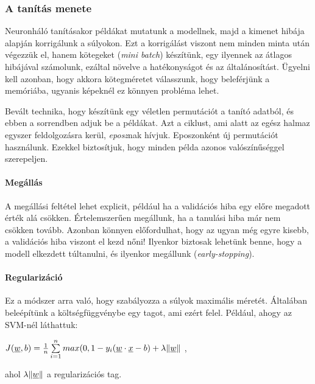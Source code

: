 \subsubsection{A tanítás menete}

Neuronháló tanításakor példákat mutatunk a modellnek, majd a kimenet
hibája alapján korrigálunk a súlyokon. Ezt a korrigálást viszont nem
minden minta után végezzük el, hanem kötegeket (\textit{mini batch}) 
készítünk, egy ilyennek az átlagos hibájával számolunk, ezáltal 
növelve a hatékonyságot és az általánosítást. Ügyelni kell azonban, hogy
akkora kötegméretet válasszunk, hogy beleférjünk a memóriába, ugyanis 
képeknél ez könnyen probléma lehet.


Bevált technika, hogy készítünk egy véletlen permutációt a tanító adatból,
és ebben a sorrendben adjuk be a példákat. Azt a ciklust, ami alatt 
az egész halmaz egyszer feldolgozásra kerül, \textit{eposz}nak hívjuk.
Eposzonként új permutációt használunk. Ezekkel biztosítjuk, hogy minden
példa azonos valószínűséggel szerepeljen.

\paragraph{Megállás}

A megállási feltétel lehet explicit, például ha a validációs hiba egy előre
megadott érték alá csökken. Értelemszerűen megállunk, ha a tanulási hiba már nem csökken tovább.
Azonban könnyen előfordulhat, hogy az ugyan még egyre kisebb, a validációs hiba
viszont el kezd nőni! Ilyenkor biztosak lehetünk benne, hogy a modell elkezdett
túltanulni, és ilyenkor megállunk (\textit{early-stopping}).


\paragraph{Regularizáció}

Ez a módszer arra való, hogy szabályozza a súlyok maximális méretét. Általában beleépítünk a 
költségfüggvénybe  egy tagot, ami ezért felel. Például, ahogy az SVM-nél láthattuk:

$ J(\underline{w},b)  = \frac{1}{n} \sum\limits_{i=1}^{n} 
max(0, 1 - y_i(\underline{w} \cdot \underline{x} - b) + \lambda \lVert\underline{w}\rVert $ ,

\noindent
ahol $  \lambda \lVert\underline{w}\rVert $ a regularizációs tag.








